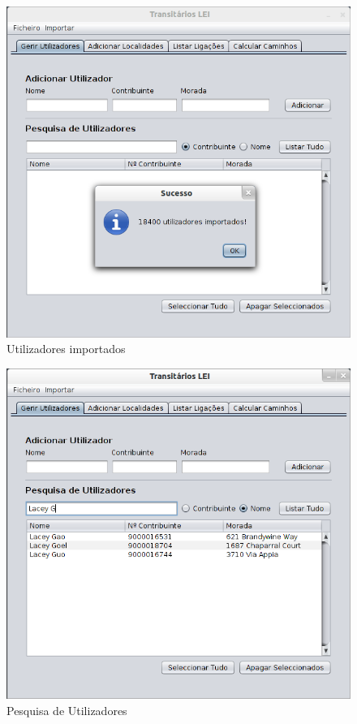 \documentclass[a5paper,twocolumn, 11pt]{article}
\begin{document}
\clearpage
\onecolumn
\newpage
\begin{figure}[h!b!t!]
    \caption[Utilizadores importados]{Utilizadores importados}
    \centering
        \includegraphics[width=330pt]{interface_1.png}
\end{figure}
\begin{figure}[h!b!t!]
    \caption[Utilizadores: Pesquisa]{Pesquisa de Utilizadores}
    \centering
        \includegraphics[width=330pt]{interface_2.png}
\end{figure}
\end{document}
